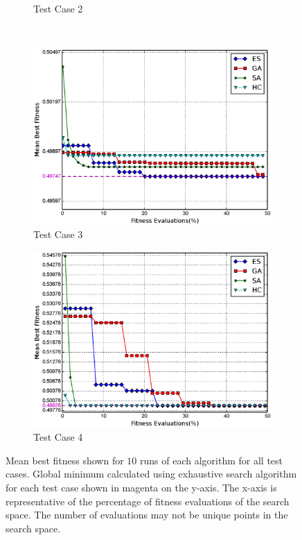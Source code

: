 \documentclass[conference]{IEEEtran}
\begin{document}
\begin{figure}
\begin{subfigure}{\columnwidth}
        \caption{Test Case 2}%
        \label{fig:tc2_mf}%
    \end{subfigure}\hfill\\
    \begin{subfigure}{\columnwidth}
        \includegraphics[width=\columnwidth]{FIG/tc3_mf.eps}%
        \caption{Test Case 3}%
        \label{fig:tc3_mf}%
    \end{subfigure}\hfill%
    \begin{subfigure}{\columnwidth}
        \includegraphics[width=\columnwidth]{FIG/tc4_mf.eps}%
        \caption{Test Case 4}%
        \label{fig:tc4_mf}%
    \end{subfigure}\hfill%
    \caption{Mean best fitness shown for $10$ runs of each algorithm for all test cases. Global minimum calculated using exhaustive search algorithm for each test case shown in magenta on the y-axis. The x-axis is representative of the percentage of fitness evaluations of the search space. The number of evaluations may not be unique points in the search space.}
\label{fig:tc_mf}
\end{figure}
 
\end{document}
